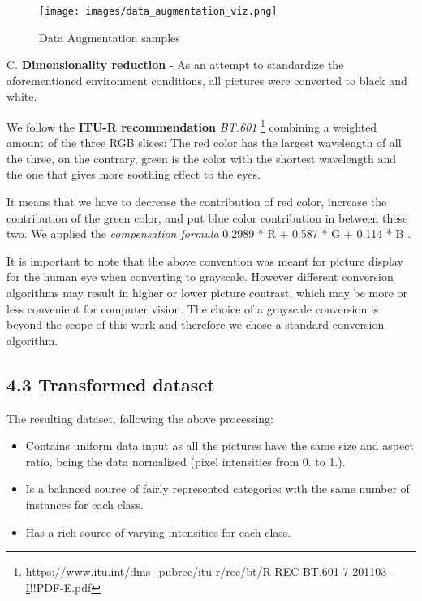 \documentclass[
  11pt,
]{article}
\providecommand{\tightlist}{%
  \setlength{\itemsep}{0pt}\setlength{\parskip}{0pt}}
\begin{document}
\begin{figure}
\centering
\texttt{[image: images/data\_augmentation\_viz.png]}
\caption{Data Augmentation samples}
\end{figure}

C. \textbf{Dimensionality reduction} - As an attempt to standardize the
aforementioned environment conditions, all pictures were converted to
black and white.

We follow the \textbf{ITU-R recommendation} \emph{BT.601} \footnote{\url{https://www.itu.int/dms_pubrec/itu-r/rec/bt/R-REC-BT.601-7-201103-I}!!PDF-E.pdf}
combining a weighted amount of the three RGB slices: The red color has
the largest wavelength of all the three, on the contrary, green is the
color with the shortest wavelength and the one that gives more soothing
effect to the eyes.

It means that we have to decrease the contribution of red color,
increase the contribution of the green color, and put blue color
contribution in between these two. We applied the \emph{compensation
formula} 0.2989 * R + 0.587 * G + 0.114 * B .

It is important to note that the above convention was meant for picture
display for the human eye when converting to grayscale. However
different conversion algorithms may result in higher or lower picture
contrast, which may be more or less convenient for computer vision. The
choice of a grayscale conversion is beyond the scope of this work and
therefore we chose a standard conversion algorithm.

\hypertarget{transformed-dataset}{%
\subsection{4.3 Transformed dataset}\label{transformed-dataset}}

The resulting dataset, following the above processing:

\begin{itemize}
\tightlist
\item
  Contains uniform data input as all the pictures have the same size and
  aspect ratio, being the data normalized (pixel intensities from 0. to
  1.).
\item
  Is a balanced source of fairly represented categories with the same
  number of instances for each class.
\item
  Has a rich source of varying intensities for each class.
\end{itemize}
\end{document}
